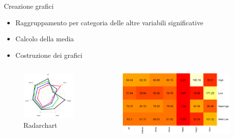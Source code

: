 	\begin{frame}
		\begin{block}{Creazione grafici}
			\begin{itemize}
				\item Raggruppamento per categoria delle altre variabili significative
				\item Calcolo della media
				\item Costruzione dei grafici
			\end{itemize}
		\end{block}
		\begin{columns}
			\begin{column}{0.45\textwidth}
				\begin{center}
					\begin{figure}
						\includegraphics[width=\columnwidth]{img/radar}
						\caption{Radarchart}
					\end{figure}
				\end{center}
			\end{column}
			\begin{column}{0.55\textwidth}
				\begin{center}
					\begin{figure}
						\includegraphics[width=\columnwidth]{img/heat}

\end{figure}
\end{center}
\end{column}
\end{columns}
\end{frame}
